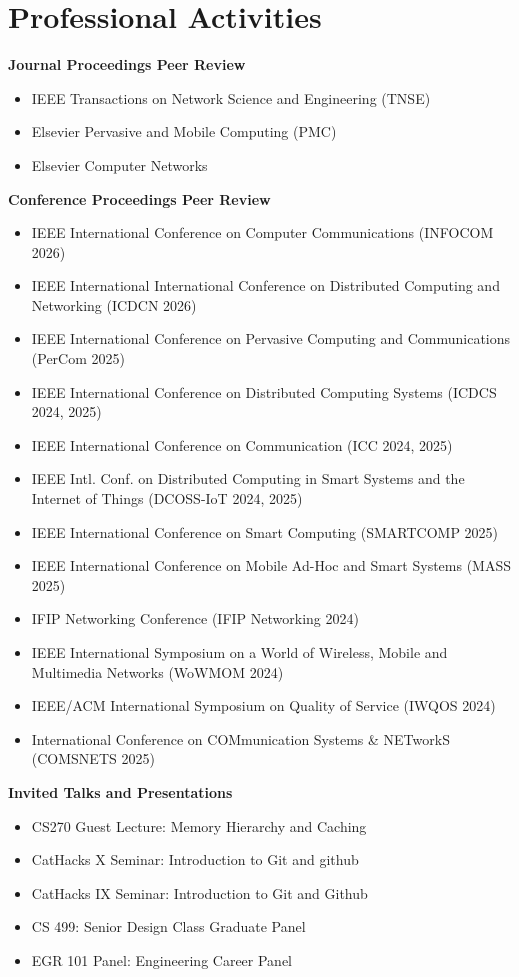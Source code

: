 \documentclass[a4paper,12pt]{article}
\begin{document}
\section{Professional Activities}

\textbf{Journal Proceedings Peer Review}
\begin{itemize}[nosep,after=\strut, leftmargin=1em, itemsep=3pt,label=--]
\item IEEE Transactions on Network Science and Engineering (TNSE)
\item Elsevier Pervasive and Mobile Computing (PMC)
\item Elsevier Computer Networks
\end{itemize}

\textbf{Conference Proceedings Peer Review}
\begin{itemize}[nosep,after=\strut, leftmargin=1em, itemsep=3pt,label=--]
\item IEEE International Conference on Computer Communications (INFOCOM 2026)
\item IEEE International International Conference on Distributed Computing and Networking (ICDCN 2026)
\item IEEE International Conference on Pervasive Computing and Communications (PerCom 2025)
\item IEEE International Conference on Distributed Computing Systems (ICDCS 2024, 2025)
\item IEEE International Conference on Communication (ICC 2024, 2025)
\item IEEE Intl. Conf. on Distributed Computing in Smart Systems and the Internet of Things (DCOSS-IoT 2024, 2025)
\item IEEE International Conference on Smart Computing (SMARTCOMP 2025)
\item IEEE International Conference on Mobile Ad-Hoc and Smart Systems (MASS 2025)
\item IFIP Networking Conference (IFIP Networking 2024)
\item IEEE International Symposium on a World of Wireless, Mobile and Multimedia Networks (WoWMOM 2024)
\item IEEE/ACM International Symposium on Quality of Service (IWQOS 2024)
\item International Conference on COMmunication Systems \& NETworkS (COMSNETS 2025)
\end{itemize}

\textbf{Invited Talks and Presentations}
\begin{itemize}[nosep,after=\strut, leftmargin=1em, itemsep=3pt,label=--]
\item CS270 Guest Lecture: Memory Hierarchy and Caching
\item CatHacks X Seminar: Introduction to Git and github
\item CatHacks IX Seminar: Introduction to Git and Github
\item CS 499: Senior Design Class Graduate Panel
\item EGR 101 Panel: Engineering Career Panel
\end{itemize}
\end{document}
